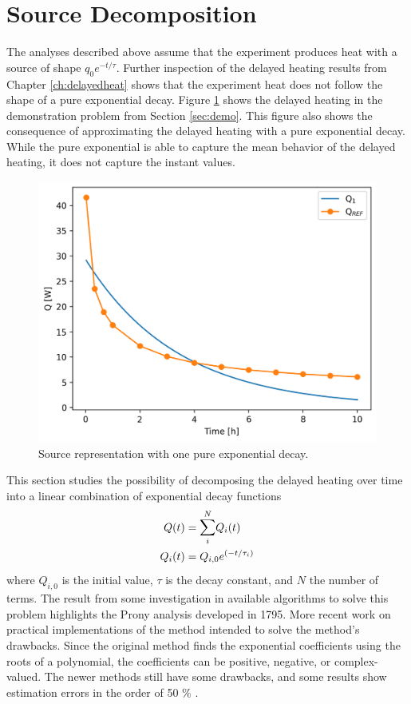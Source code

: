 \section{Source Decomposition}
\label{sec:sou_decomp}


The analyses described above assume that the experiment produces heat with a source of shape $q_0 e^{-t/\tau}$.
Further inspection of the delayed heating results from Chapter \ref{ch:delayedheat} shows that the experiment heat does not follow the shape of a pure exponential decay.
Figure \ref{fig:one-exp} shows the delayed heating in the demonstration problem from Section \ref{sec:demo}.
This figure also shows the consequence of approximating the delayed heating with a pure exponential decay.
While the pure exponential is able to capture the mean behavior of the delayed heating, it does not capture the instant values.

\begin{figure}[htbp!] %
    \centering
    \includegraphics[width=0.45\linewidth]{figures/pure-exponential-demo}
    \hfill
    \caption{Source representation with one pure exponential decay.}
    \label{fig:one-exp}
\end{figure}

This section studies the possibility of decomposing the delayed heating over time into a linear combination of exponential decay functions
\begin{align}
Q(t) &= \mathlarger{\sum}_i^N Q_i(t) \label{eq:decomp} \\
Q_i(t) &= Q_{i, 0} e^{(-t/\tau_i)}
\end{align}
where $Q_{i,0}$ is the initial value, $\tau$ is the decay constant, and $N$ the number of terms.
The result from some investigation in available algorithms to solve this problem highlights the Prony analysis developed in 1795.
More recent work on practical implementations of the method \cite{expsum1}\cite{expsum2} intended to solve the method's drawbacks.
Since the original method finds the exponential coefficients using the roots of a polynomial, the coefficients can be positive, negative, or complex-valued.
The newer methods still have some drawbacks, and some results show estimation errors in the order of 50 \% \cite{expsum0}.

